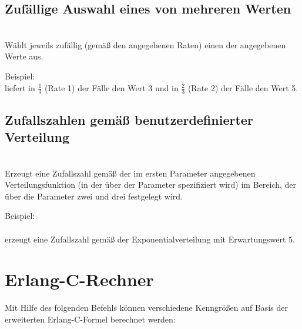 \section{Zufällige Auswahl eines von mehreren Werten}

\\
Wählt jeweils zufällig (gemäß den angegebenen Raten) einen der angegebenen Werte aus.

Beispiel:
\\
liefert in $\frac{1}{3}$ (Rate 1) der Fälle den Wert 3 und in $\frac{2}{3}$ (Rate 2) der Fälle den Wert 5.



\section{Zufallszahlen gemäß benutzerdefinierter Verteilung}

\\
Erzeugt eine Zufallszahl gemäß der im ersten Parameter angegebenen Verteilungsfunktion (in der über  der Parameter spezifiziert wird) im Bereich, der über die Parameter zwei und drei festgelegt wird.

Beispiel:\\
\\
erzeugt eine Zufallszahl gemäß der Exponentialverteilung mit Erwartungswert 5.



\chapter{Erlang-C-Rechner}

Mit Hilfe des folgenden Befehls können verschiedene Kenngrößen auf Basis der
erweiterten Erlang-C-Formel berechnet werden:

